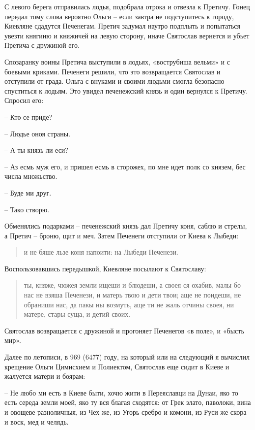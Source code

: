 С левого берега отправилась лодья, подобрала отрока и отвезла к Претичу. Гонец передал тому слова вероятно Ольги – если завтра не подступитесь к городу, Киевляне сдадутся Печенегам. Претич задумал наутро подплыть и попытаться увезти княгиню и княжичей на левую сторону, иначе Святослав вернется и убьет Претича с дружиной его.

Спозаранку воины Претича выступили в лодьях, «вострубиша вельми» и с боевыми криками. Печенеги решили, что это возвращается Святослав и отступили от града. Ольга с внуками и своими людьми смогла безопасно спуститься к лодьям. Это увидел печенежский князь и один вернулся к Претичу. Спросил его:

   – Кто се приде?

   – Людье оноя страны.

   – А ты князь ли еси?

   – Аз есмь муж его, и пришел есмь в сторожех, по мне идет полк со князем, бес числа множьство.

   – Буде ми друг.

   – Тако створю.

Обменялись подарками – печенежский князь дал Претичу коня, саблю и стрелы, а Претич – броню, щит и меч. Затем Печенеги отступили от Киева к Лыбеди:

\begin{quotation}
и не бяше льзе коня напоити: на Лыбеди Печенези.
\end{quotation}

Воспользовавшись передышкой, Киевляне посылают к Святославу:

\begin{quotation}
ты, княже, чюжея земли ищеши и блюдеши, а своея ся охабив, малы бо нас не взяша Печенези, и матерь твою и дети твои; аще не поидеши, не обраниши нас, да пакы ны возмуть, аще ти не жаль отчины своея, ни матере, стары суща, и детий своих.
\end{quotation}

Святослав возвращается с дружиной и прогоняет Печенегов «в поле», и «бысть мир».

Далее по летописи, в 969 (6477) году, на который или на следующий я вычислил крещение Ольги Цимисхием и Полиектом, Святослав еще сидит в Киеве и жалуется матери и боярам:

   – Не любо ми есть в Киеве быти, хочю жити в Переяславци на Дунаи, яко то есть середа земли моей, яко ту вся благая сходятся: от Грек злато, паволоки, вина и овощеве разноличныя, из Чех же, из Угорь сребро и комони, из Руси же скора и воск, мед и челядь.

